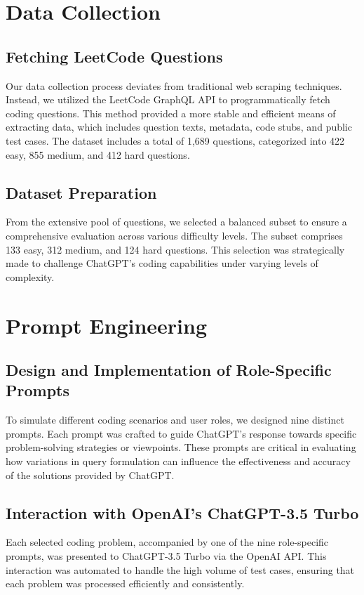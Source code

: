 \section{Data Collection}
\subsection{Fetching LeetCode Questions}
Our data collection process deviates from traditional web scraping techniques. Instead, we utilized the LeetCode GraphQL API to programmatically fetch coding questions. This method provided a more stable and efficient means of extracting data, which includes question texts, metadata, code stubs, and public test cases. The dataset includes a total of 1,689 questions, categorized into 422 easy, 855 medium, and 412 hard questions.

\subsection{Dataset Preparation}
From the extensive pool of questions, we selected a balanced subset to ensure a comprehensive evaluation across various difficulty levels. The subset comprises 133 easy, 312 medium, and 124 hard questions. This selection was strategically made to challenge ChatGPT's coding capabilities under varying levels of complexity.

\section{Prompt Engineering}
\subsection{Design and Implementation of Role-Specific Prompts}
To simulate different coding scenarios and user roles, we designed nine distinct prompts. Each prompt was crafted to guide ChatGPT's response towards specific problem-solving strategies or viewpoints. These prompts are critical in evaluating how variations in query formulation can influence the effectiveness and accuracy of the solutions provided by ChatGPT.

\subsection{Interaction with OpenAI's ChatGPT-3.5 Turbo}
Each selected coding problem, accompanied by one of the nine role-specific prompts, was presented to ChatGPT-3.5 Turbo via the OpenAI API. This interaction was automated to handle the high volume of test cases, ensuring that each problem was processed efficiently and consistently.

